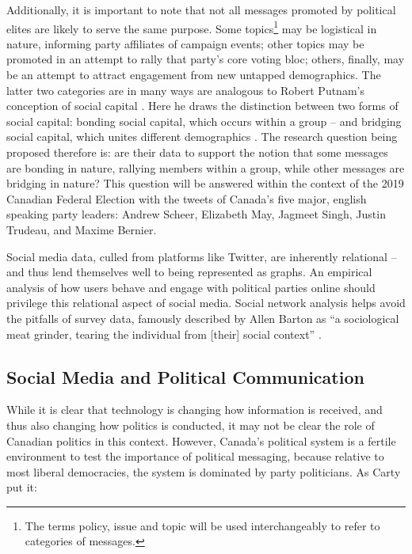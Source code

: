 \documentclass{nws}
\begin{document}
Additionally, it is important to note that not all messages promoted by
political elites are likely to serve the same purpose. Some topics\footnote{The
terms policy, issue and topic will be used interchangeably to refer to
categories of messages.} may be logistical in nature, informing party affiliates
of campaign events; other topics may be promoted in an attempt to rally that
party's core voting bloc; others, finally, may be an attempt to attract
engagement from new untapped demographics. The latter two categories are in many
ways are analogous to Robert Putnam's conception of social capital
\cite{putnam2001social}. Here he draws the distinction between two forms of
social capital: bonding social capital, which occurs within a group -- and
bridging social capital, which unites different demographics
\cite{putnam2001social}. The research question being proposed therefore is: are
their data to support the notion that some messages are bonding in nature,
rallying members within a group, while other messages are bridging in nature?
This question will be answered within the context of the 2019 Canadian Federal
Election with the tweets of Canada’s five major, english speaking party leaders:
Andrew Scheer, Elizabeth May, Jagmeet Singh, Justin Trudeau, and Maxime Bernier. 

Social media data, culled from platforms like Twitter, are inherently
relational -- and thus lend themselves well to being represented as graphs.  An
empirical analysis of how users behave and engage with political parties online
should privilege this relational aspect of social media. Social network
analysis helps avoid the pitfalls of survey data, famously described by Allen
Barton as “a sociological meat grinder, tearing the individual from [their]
social context” \cite{freeman2004development}.  



\subsection{Social Media and Political Communication}

While it is clear that technology is changing how information is received, and
thus also changing how politics is conducted, it may not be clear the role of
Canadian politics in this context. However, Canada’s political system is a
fertile environment to test the importance of political messaging, because
relative to most liberal democracies, the system is dominated by party
politicians. As Carty put it: 
\end{document}
